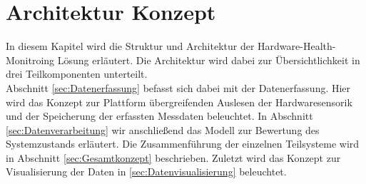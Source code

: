 \chapter{Architektur Konzept}
In diesem Kapitel wird die Struktur und Architektur der Hardware-Health-Monitroing Lösung erläutert. Die Architektur wird dabei zur Übersichtlichkeit in drei Teilkomponenten unterteilt.\\
Abschnitt \ref{sec:Datenerfassung} befasst sich dabei mit der Datenerfassung. Hier wird das Konzept zur Plattform übergreifenden Auslesen der Hardwaresensorik und der Speicherung der erfassten Messdaten beleuchtet. In Abschnitt \ref{sec:Datenverarbeitung} wir anschließend das Modell zur Bewertung des Systemzustands erläutert.
Die Zusammenführung der einzelnen Teilsysteme wird in Abschnitt \ref{sec:Gesamtkonzept} beschrieben. Zuletzt wird das Konzept zur Visualisierung der Daten in \ref{sec:Datenvisualisierung} beleuchtet. 